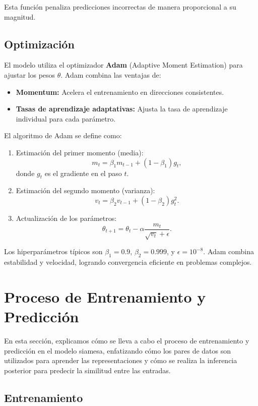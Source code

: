 Esta función penaliza predicciones incorrectas de manera proporcional a su magnitud.

\subsection{Optimización}

El modelo utiliza el optimizador \textbf{Adam} (Adaptive Moment Estimation) para ajustar los pesos \( \theta \). Adam combina las ventajas de:
\begin{itemize}
    \item \textbf{Momentum:} Acelera el entrenamiento en direcciones consistentes.
    \item \textbf{Tasas de aprendizaje adaptativas:} Ajusta la tasa de aprendizaje individual para cada parámetro.
\end{itemize}

El algoritmo de Adam se define como:
\begin{enumerate}
    \item Estimación del primer momento (media):
    \[
    m_t = \beta_1 m_{t-1} + (1 - \beta_1) g_t,
    \]
    donde \( g_t \) es el gradiente en el paso \( t \).

    \item Estimación del segundo momento (varianza):
    \[
    v_t = \beta_2 v_{t-1} + (1 - \beta_2) g_t^2.
    \]

    \item Actualización de los parámetros:
    \[
    \theta_{t+1} = \theta_t - \alpha \frac{m_t}{\sqrt{v_t} + \epsilon}.
    \]
\end{enumerate}

Los hiperparámetros típicos son \( \beta_1 = 0.9 \), \( \beta_2 = 0.999 \), y \( \epsilon = 10^{-8} \). Adam combina estabilidad y velocidad, logrando convergencia eficiente en problemas complejos.


\section{Proceso de Entrenamiento y Predicción}

En esta sección, explicamos cómo se lleva a cabo el proceso de entrenamiento y predicción en el modelo siamesa, enfatizando cómo los pares de datos son utilizados para aprender las representaciones y cómo se realiza la inferencia posterior para predecir la similitud entre las entradas.

\subsection{Entrenamiento}

